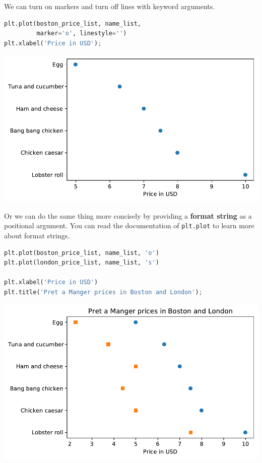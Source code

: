 We can turn on markers and turn off lines with keyword arguments.

\begin{lstlisting}[language=Python]
plt.plot(boston_price_list, name_list, 
         marker='o', linestyle='')
plt.xlabel('Price in USD');
\end{lstlisting}

\begin{center}
\includegraphics[scale=0.75]{chapters/06_plotting_files/06_plotting_42_0.pdf}
\end{center}

Or we can do the same thing more concisely by providing a \textbf{format
string} as a positional argument. You can read the documentation of
\passthrough{\lstinline!plt.plot!} to learn more about format strings.

\begin{lstlisting}[language=Python]
plt.plot(boston_price_list, name_list, 'o')
plt.plot(london_price_list, name_list, 's')

plt.xlabel('Price in USD')
plt.title('Pret a Manger prices in Boston and London');
\end{lstlisting}

\begin{center}
\includegraphics[scale=0.75]{chapters/06_plotting_files/06_plotting_44_0.pdf}
\end{center}


